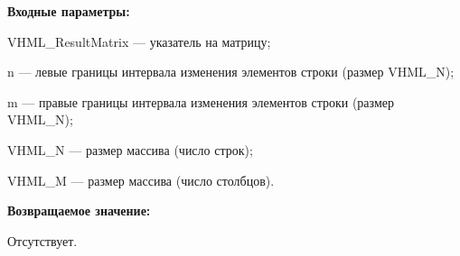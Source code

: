\textbf{Входные параметры:}
 
VHML\_ResultMatrix --- указатель на матрицу;
 
n --- левые границы интервала изменения элементов строки (размер VHML\_N);
 
m --- правые границы интервала изменения элементов строки (размер VHML\_N);
 
VHML\_N --- размер массива (число строк);
 
VHML\_M --- размер массива (число столбцов).

\textbf{Возвращаемое значение:}

Отсутствует.